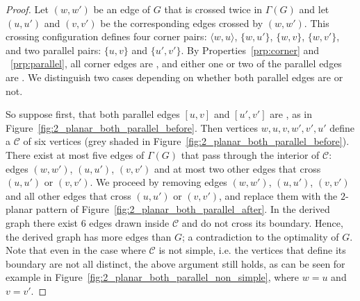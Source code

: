 \begin{proof}
Let $(w,w')$ be an edge of $G$ that is crossed twice in $\Gamma(G)$ and let 
$(u,u')$ and $(v,v')$ be the corresponding edges crossed by $(w,w')$. This crossing configuration defines four 
corner pairs: $\langle w,u \rangle$, 
$\{w,u'\}$, $\{w,v\}$, $\{w,v'\}$, and two parallel pairs: $\{u,v\}$ and 
$\{u',v'\}$. By Properties~\ref{prp:corner} and 
~\ref{prp:parallel}, all corner edges are \pes, and either one or two of the 
parallel edges are \pes. We distinguish two cases depending on whether both 
parallel edges are \pes or not.

So suppose first, that both parallel edges $[u,v]$ and $[u',v']$ are \pes, as 
in Figure~\ref{fig:2_planar_both_parallel_before}. Then vertices 
$w,u,v,w',v',u'$ define a \pp $\mathcal{C}$ of six vertices (grey shaded in 
Figure~\ref{fig:2_planar_both_parallel_before}). There exist at most five edges 
of $\Gamma(G)$ that pass through the interior of $\mathcal{C}$: edges $(w,w')$, 
$(u,u')$, $(v,v')$ and at most two other edges that cross $(u,u')$ or $(v,v')$. 
We proceed by removing  edges $(w,w')$, $(u,u')$, $(v,v')$ and all other edges 
that cross $(u,u')$ or $(v,v')$, and replace them with the $2$-planar pattern of 
Figure~\ref{fig:2_planar_both_parallel_after}. In the derived graph there exist $6$ edges drawn 
inside $\mathcal{C}$ and do not cross its boundary. Hence, the derived graph has 
more edges than $G$; a contradiction to the optimality of $G$. Note that even in the case 
where $\mathcal{C}$ is not simple, i.e. the vertices that define its boundary 
are not all distinct, the above argument still holds, as can be seen for example 
in Figure~\ref{fig:2_planar_both_parallel_non_simple}, where $w=u$ and $v=v'$.


\end{proof}

